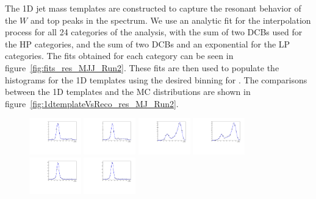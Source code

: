 The 1D jet mass templates are constructed to capture the resonant behavior of the $W$ and top peaks in the \MJ spectrum.
We use an analytic fit for the interpolation process for all 24 categories of the analysis, with the sum of two DCBs used for the HP categories, and the sum of two DCBs and an exponential for the LP categories.
The fits obtained for each category can be seen in figure~\ref{fig:fits_res_MJJ_Run2}.
These fits are then used to populate the histograms for the 1D templates using the desired binning for \MJ.
The comparisons between the 1D templates and the MC distributions are shown in figure~\ref{fig:1dtemplateVsReco_res_MJ_Run2}.

\begin{figure}[htbp]
  \centering
  \includegraphics[width=0.2\textwidth]{fig/2Dfit/LNuJJ_res_MJJ_mu_HP_bb_LDy.pdf}
  \includegraphics[width=0.2\textwidth]{fig/2Dfit/LNuJJ_res_MJJ_e_HP_bb_LDy.pdf}
  \includegraphics[width=0.2\textwidth]{fig/2Dfit/LNuJJ_res_MJJ_mu_LP_bb_LDy.pdf}
  \includegraphics[width=0.2\textwidth]{fig/2Dfit/LNuJJ_res_MJJ_e_LP_bb_LDy.pdf}\\
  \includegraphics[width=0.2\textwidth]{fig/2Dfit/LNuJJ_res_MJJ_mu_HP_nobb_LDy.pdf}
  \includegraphics[width=0.2\textwidth]{fig/2Dfit/LNuJJ_res_MJJ_e_HP_nobb_LDy.pdf}

\end{figure}

